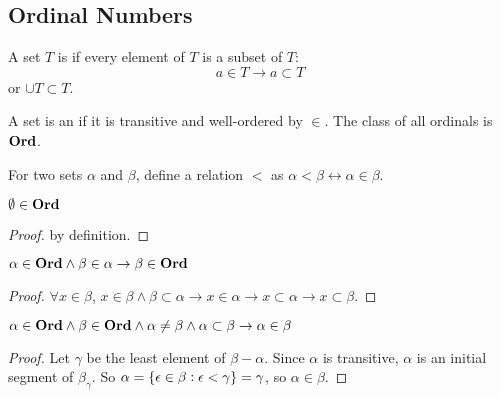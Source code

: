 \subsection{Ordinal Numbers}

\begin{definition}
    A set $T$ is  if every element of $T$ is a subset of $T$:
    \begin{equation}
        a \in T \rightarrow a \subset T
    \end{equation}
    or $\cup T \subset T$.
\end{definition}

\begin{definition}
    A set is an  if it is transitive and well-ordered by $\in$. The class of all ordinals is $\mathbf{Ord}$.
\end{definition}

\begin{definition}
    For two sets $\alpha$ and $\beta$, define a relation $<$ as $\alpha < \beta \leftrightarrow \alpha \in \beta$.
\end{definition}

\begin{theorem}
    $\emptyset \in \mathbf{Ord}$
\end{theorem}
\begin{proof}
    by definition.
\end{proof}

\begin{theorem}
    $\alpha \in \mathbf{Ord} \wedge \beta \in \alpha \rightarrow \beta \in \mathbf{Ord}$
\end{theorem}
\begin{proof}
    $\forall x \in \beta$, $x \in \beta \wedge \beta \subset \alpha \rightarrow x \in \alpha \rightarrow x \subset \alpha \rightarrow x \subset \beta $.
\end{proof}

\begin{theorem}
    $\alpha \in \mathbf{Ord} \wedge \beta \in \mathbf{Ord} \wedge \alpha \neq \beta \wedge \alpha \subset \beta  \rightarrow \alpha \in \beta$    
\end{theorem}
\begin{proof}
    Let $\gamma$ be the least element of $\beta - \alpha$. Since $\alpha$ is transitive, $\alpha$ is an initial segment of $\beta_\gamma$. So $\alpha = \set{\epsilon \in \beta: \epsilon < \gamma} = \gamma$, so $\alpha \in \beta$.
\end{proof}


